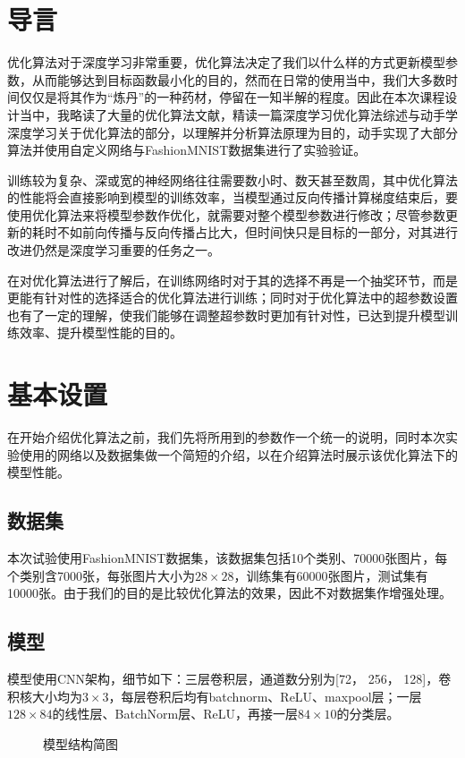 \documentclass[10.5pt,a4paper]{article}%
\begin{document}
        \section{导言}
        优化算法对于深度学习非常重要，优化算法决定了我们以什么样的方式更新模型参数，从而能够达到目标函数最小化的目的，然而在日常的使用当中，我们大多数时间仅仅是将其作为“炼丹”的一种药材，停留在一知半解的程度。因此在本次课程设计当中，我略读了大量的优化算法文献，精读一篇深度学习优化算法综述\cite{zongshu}与动手学深度学习\cite{d2l}关于优化算法的部分，以理解并分析算法原理为目的，动手实现了大部分算法并使用自定义网络与FashionMNIST数据集进行了实验验证。\par
        训练较为复杂、深或宽的神经网络往往需要数小时、数天甚至数周，其中优化算法的性能将会直接影响到模型的训练效率，当模型通过反向传播计算梯度结束后，要使用优化算法来将模型参数作优化，就需要对整个模型参数进行修改；尽管参数更新的耗时不如前向传播与反向传播占比大，但时间快只是目标的一部分，对其进行改进仍然是深度学习重要的任务之一。\par
        在对优化算法进行了解后，在训练网络时对于其的选择不再是一个抽奖环节，而是更能有针对性的选择适合的优化算法进行训练；同时对于优化算法中的超参数设置也有了一定的理解，使我们能够在调整超参数时更加有针对性，已达到提升模型训练效率、提升模型性能的目的。\par
        \section{基本设置}
        在开始介绍优化算法之前，我们先将所用到的参数作一个统一的说明，同时本次实验使用的网络以及数据集做一个简短的介绍，以在介绍算法时展示该优化算法下的模型性能。
        \subsection{数据集}
        本次试验使用FashionMNIST数据集\cite{fashionmnist}，该数据集包括10个类别、70000张图片，每个类别含7000张，每张图片大小为$28\times28$，训练集有60000张图片，测试集有10000张。由于我们的目的是比较优化算法的效果，因此不对数据集作增强处理。
        \subsection{模型}
        模型使用CNN架构，细节如下：三层卷积层，通道数分别为[72， 256， 128]，卷积核大小均为$3\times3$，每层卷积后均有batchnorm、ReLU、maxpool层；一层$128\times84$的线性层、BatchNorm层、ReLU，再接一层$84\times10$的分类层。
        \begin{figure}[h]
            
            \caption{模型结构简图}
        \end{figure}
\end{document}
